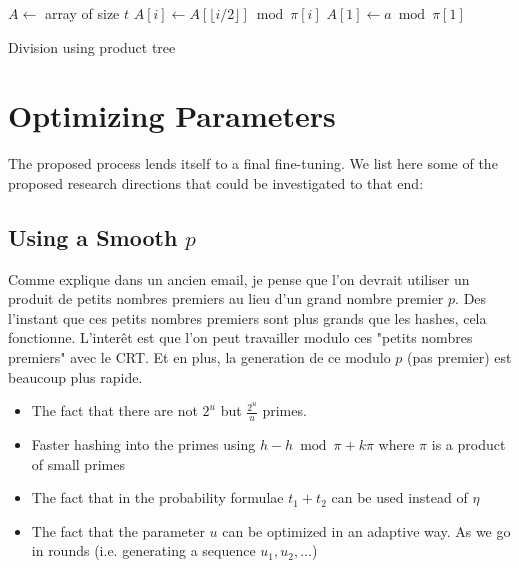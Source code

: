 \documentclass[11pt]{llncs}
\begin{document}
\begin{algorithm}
\newcommand{\vstart}{\ensuremath{\mathrm{start}}}
\newcommand{\vmid}{\ensuremath{\mathrm{mid}}}
\newcommand{\vend}{\ensuremath{\mathrm{end}}}
\begin{algorithmic}[1]
\State $A \gets $ array of size $t$
    \State $A[i] \gets A[\lfloor i/2 \rfloor] \bmod \pi[i]$
    \State {}
    \State {}
  \EndIf
\EndFunction
\State $A[1] \gets a \bmod \pi[1]$
\State {}
\State {}
\end{algorithmic}
\caption{Division using product tree}\label{alg:div-prod-tree}
\end{algorithm}

\section{Optimizing Parameters}

The proposed process lends itself to a final fine-tuning. We list here some of the proposed research directions that could be investigated to that end:

\subsection{Using a Smooth $p$}

Comme explique dans un ancien email, je pense que l'on devrait utiliser un produit de petits nombres premiers au lieu d'un grand nombre premier $p$. Des l'instant que ces petits nombres premiers sont plus grands que les hashes, cela fonctionne. L'interêt est que l'on peut travailler modulo ces "petits nombres premiers" avec le CRT. Et en plus, la generation de ce modulo $p$ (pas premier) est beaucoup plus rapide.

\begin{itemize}
\item The fact that there are not $2^u$ but $\frac{2^u}{u}$ primes.
\item Faster hashing into the primes using $h-h \bmod \pi + k \pi$ where $\pi$ is a product of small primes
\item The fact that in the probability formulae $t_1+t_2$ can be used instead of $\eta$
\item The fact that the parameter $u$ can be optimized in an adaptive way. As we go in rounds (i.e. generating a sequence $u_1,u_2,...$)
\end{itemize}
\end{document}
